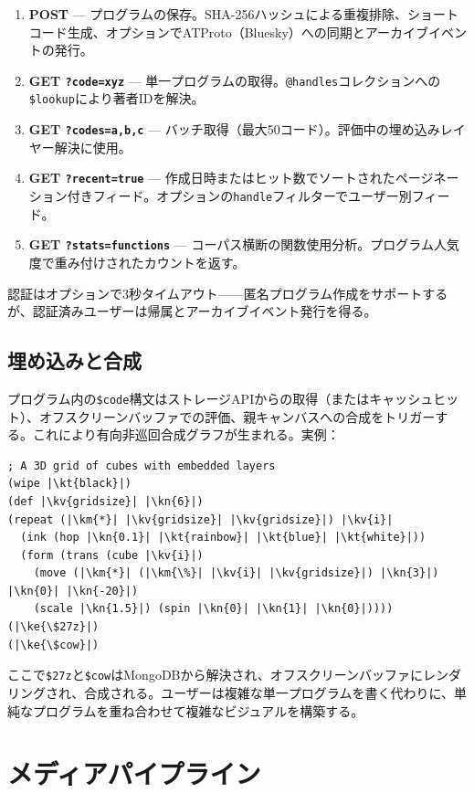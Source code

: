 \documentclass[10pt,letterpaper,twocolumn]{article}
\newcommand{\kn}[1]{\textcolor{klnum}{#1}}
\newcommand{\kt}[1]{\textcolor{klstr}{#1}}
\newcommand{\kv}[1]{\textcolor{klvar}{#1}}
\newcommand{\ke}[1]{\textcolor{klembed}{\textbf{#1}}}
\newcommand{\km}[1]{\textcolor{klmath}{#1}}
\begin{document}
\begin{enumerate}
  \item \textbf{POST} --- プログラムの保存。SHA-256ハッシュによる重複排除、ショートコード生成、オプションでATProto（Bluesky）への同期とアーカイブイベントの発行。
  \item \textbf{GET \texttt{?code=xyz}} --- 単一プログラムの取得。\texttt{@handles}コレクションへの\texttt{\$lookup}により著者IDを解決。
  \item \textbf{GET \texttt{?codes=a,b,c}} --- バッチ取得（最大50コード）。評価中の埋め込みレイヤー解決に使用。
  \item \textbf{GET \texttt{?recent=true}} --- 作成日時またはヒット数でソートされたページネーション付きフィード。オプションの\texttt{handle}フィルターでユーザー別フィード。
  \item \textbf{GET \texttt{?stats=functions}} --- コーパス横断の関数使用分析。プログラム人気度で重み付けされたカウントを返す。
\end{enumerate}

認証はオプションで3秒タイムアウト——匿名プログラム作成をサポートするが、認証済みユーザーは帰属とアーカイブイベント発行を得る。

\subsection{埋め込みと合成}

プログラム内の\texttt{\$code}構文はストレージAPIからの取得（またはキャッシュヒット）、オフスクリーンバッファでの評価、親キャンバスへの合成をトリガーする。これにより有向非巡回合成グラフが生まれる。実例：

\begin{lstlisting}
; A 3D grid of cubes with embedded layers
(wipe |\kt{black}|)
(def |\kv{gridsize}| |\kn{6}|)
(repeat (|\km{*}| |\kv{gridsize}| |\kv{gridsize}|) |\kv{i}|
  (ink (hop |\kn{0.1}| |\kt{rainbow}| |\kt{blue}| |\kt{white}|))
  (form (trans (cube |\kv{i}|)
    (move (|\km{*}| (|\km{\%}| |\kv{i}| |\kv{gridsize}|) |\kn{3}|) |\kn{0}| |\kn{-20}|)
    (scale |\kn{1.5}|) (spin |\kn{0}| |\kn{1}| |\kn{0}|))))
(|\ke{\$27z}|)
(|\ke{\$cow}|)
\end{lstlisting}

ここで\texttt{\$27z}と\texttt{\$cow}はMongoDBから解決され、オフスクリーンバッファにレンダリングされ、合成される。ユーザーは複雑な単一プログラムを書く代わりに、単純なプログラムを重ね合わせて複雑なビジュアルを構築する。

\section{メディアパイプライン}
\label{sec:media}
\end{document}
